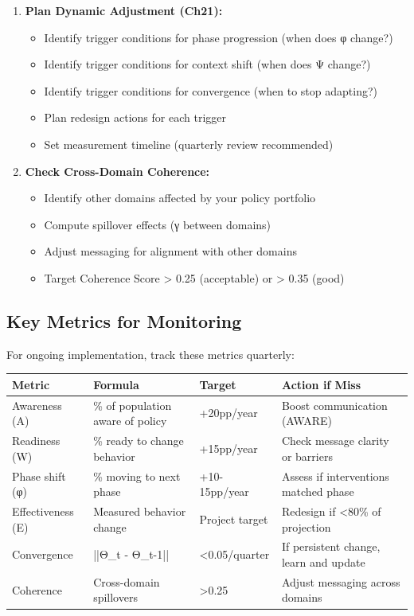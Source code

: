 \begin{enumerate}
\item \textbf{Plan Dynamic Adjustment (Ch21):}
   \begin{itemize}
   \item Identify trigger conditions for phase progression (when does φ change?)
   \item Identify trigger conditions for context shift (when does Ψ change?)
   \item Identify trigger conditions for convergence (when to stop adapting?)
   \item Plan redesign actions for each trigger
   \item Set measurement timeline (quarterly review recommended)
   \end{itemize}

\item \textbf{Check Cross-Domain Coherence:}
   \begin{itemize}
   \item Identify other domains affected by your policy portfolio
   \item Compute spillover effects (γ between domains)
   \item Adjust messaging for alignment with other domains
   \item Target Coherence Score > 0.25 (acceptable) or > 0.35 (good)
   \end{itemize}

\end{enumerate}

\subsection{Key Metrics for Monitoring}

For ongoing implementation, track these metrics quarterly:

\begin{center}
\begin{tabular}{@{}llll@{}}
\toprule
\textbf{Metric} & \textbf{Formula} & \textbf{Target} & \textbf{Action if Miss} \\
\midrule
Awareness (A) & \% of population aware of policy & +20pp/year & Boost communication (AWARE) \\
Readiness (W) & \% ready to change behavior & +15pp/year & Check message clarity or barriers \\
Phase shift (φ) & \% moving to next phase & +10-15pp/year & Assess if interventions matched phase \\
Effectiveness (E) & Measured behavior change & Project target & Redesign if <80\% of projection \\
Convergence & ||Θ\_t - Θ_{t-1}|| & <0.05/quarter & If persistent change, learn and update \\
Coherence & Cross-domain spillovers & >0.25 & Adjust messaging across domains \\
\midrule
\end{tabular}
\end{center}

